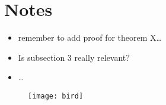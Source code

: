 \documentclass[a4paper]{article}
\begin{document}
\section*{Notes}
\begin{itemize}
  \item remember to add proof for theorem X\ldots
  \item Is subsection 3 really relevant?
  \item \ldots
\end{itemize}

\begin{figure}[htp]
\begin{center}
  \texttt{[image: bird]}
\end{center}
\end{figure}



\end{document}
